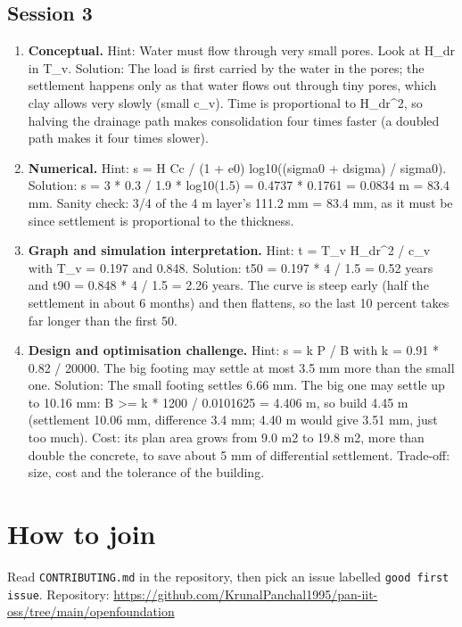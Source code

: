 \documentclass[11pt,a4paper]{article}
\begin{document}
\subsection*{Session 3}
\begin{enumerate}[nosep]
\item \textbf{Conceptual.} Hint: Water must flow through very small pores. Look at H\_dr in T\_v. Solution: The load is first carried by the water in the pores; the settlement happens only as that water flows out through tiny pores, which clay allows very slowly (small c\_v). Time is proportional to H\_dr\textasciicircum{}2, so halving the drainage path makes consolidation four times faster (a doubled path makes it four times slower).
\item \textbf{Numerical.} Hint: s = H Cc / (1 + e0) log10((sigma0 + dsigma) / sigma0). Solution: s = 3 * 0.3 / 1.9 * log10(1.5) = 0.4737 * 0.1761 = 0.0834 m = 83.4 mm. Sanity check: 3/4 of the 4 m layer's 111.2 mm = 83.4 mm, as it must be since settlement is proportional to the thickness.
\item \textbf{Graph and simulation interpretation.} Hint: t = T\_v H\_dr\textasciicircum{}2 / c\_v with T\_v = 0.197 and 0.848. Solution: t50 = 0.197 * 4 / 1.5 = 0.52 years and t90 = 0.848 * 4 / 1.5 = 2.26 years. The curve is steep early (half the settlement in about 6 months) and then flattens, so the last 10 percent takes far longer than the first 50.
\item \textbf{Design and optimisation challenge.} Hint: s = k P / B with k = 0.91 * 0.82 / 20000. The big footing may settle at most 3.5 mm more than the small one. Solution: The small footing settles 6.66 mm. The big one may settle up to 10.16 mm: B \textgreater{}= k * 1200 / 0.0101625 = 4.406 m, so build 4.45 m (settlement 10.06 mm, difference 3.4 mm; 4.40 m would give 3.51 mm, just too much). Cost: its plan area grows from 9.0 m2 to 19.8 m2, more than double the concrete, to save about 5 mm of differential settlement. Trade-off: size, cost and the tolerance of the building.
\end{enumerate}

\section{How to join}
Read \texttt{CONTRIBUTING.md} in the repository, then pick an issue labelled \texttt{good first issue}. Repository: \url{https://github.com/KrunalPanchal1995/pan-iit-oss/tree/main/openfoundation}
\end{document}
